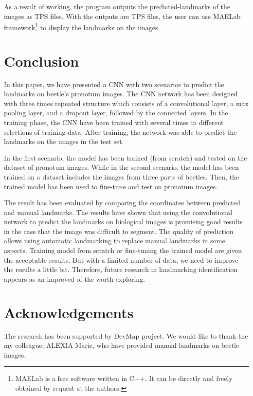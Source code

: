 \documentclass[10pt]{article}
\begin{document}
As a result of working, the program outputs the
predicted-landmarks of the images as TPS files. With the outputs are TPS files,
the user can use MAELab framework\footnote{MAELab is a free software written in C++. It can be directly and freely
obtained by request at the authors.} to display the
landmarks on the images.
\section{Conclusion}
In this paper, we have presented a CNN with two scenarios to predict the landmarks on beetle's pronotum images. The CNN network has been designed with three times repeated structure which consists of a convolutional layer, a max pooling layer, and a dropout layer, followed by the connected layers. In the training phase, the CNN have been trained with several times in different selections of training data. After training, the network was able to predict the landmarks on the images in the test set. 

In the first scenario, the model has been trained (from scratch) and tested on the dataset of pronotum images. While in the second scenario, the model has been trained on a dataset includes the images from three parts of beetles. Then, the trained model has been used to fine-tune and test on pronotum images.

The result has been evaluated by comparing the coordinates between predicted and manual landmarks.  The results have shown that using the convolutional network to predict the landmarks on biological images is promising good results in the case that the image was difficult to segment. The quality of prediction allows using automatic landmarking to replace manual landmarks in some aspects. Training model from scratch or fine-tuning the trained model are given the acceptable results. But with a limited number of data, we need to improve the results a little bit. Therefore, future research in landmarking identification appears as an improved of the worth exploring.

\section*{Acknowledgements}
The research has been supported by DevMap project. We would like to thank the my colleague, ALEXIA Marie, who have provided manual landmarks on beetle images.


\end{document}
